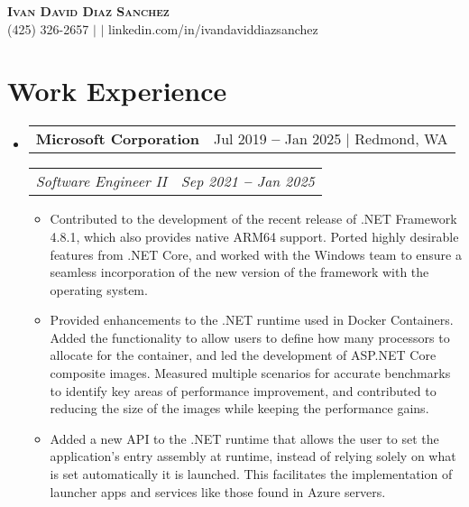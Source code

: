 \documentclass[letterpaper, 11pt]{article}
\makeatletter
\newcommand{\resumeCompanyHeading}[3]{
  \vspace{-2pt}\item
  \begin{tabular*}{0.97\textwidth}[t]{l@{\extracolsep{\fill}}r}
    \textbf{#1} & #2 $|$ #3
  \end{tabular*}
}
\newcommand{\resumePositionHeading}[2]{
  \vspace{-3pt}
  \begin{tabular*}{0.97\textwidth}[t]{l@{\extracolsep{\fill}}r}
    \textit{\small#1} & \textit{\small#2}
  \end{tabular*}\vspace{-7pt}
}
\newcommand{\resumeItem}[1]{
  \item\small{
    {#1 \vspace{-2pt}}
  }
}
\makeatother
\begin{document}
\begin{center}
  \textbf{\Huge \scshape Ivan David Diaz Sanchez} \\ \vspace{3pt}
  \small{
    \faPhone\space (425) 326-2657 $|$
    \Letter{} $|$
    \faLinkedin\space linkedin.com/in/ivandaviddiazsanchez
  }
\end{center}


\section{Work Experience}
\vspace{1pt}
\begin{itemize}[leftmargin=0.15in, label={}]


  \resumeCompanyHeading
    {Microsoft Corporation}{Jul 2019 \textbf{--} Jan 2025}{Redmond, WA}


    \resumePositionHeading
      {Software Engineer II}{Sep 2021 \textbf{--} Jan 2025}

      \begin{itemize}
        \resumeItem{Contributed to the development of the recent release of .NET Framework 4.8.1, which also provides native ARM64 support. Ported highly desirable features from .NET Core, and worked with the Windows team to ensure a seamless incorporation of the new version of the framework with the operating system.}
        \resumeItem{Provided enhancements to the .NET runtime used in Docker Containers. Added the functionality to allow users to define how many processors to allocate for the container, and led the development of ASP.NET Core composite images. Measured multiple scenarios for accurate benchmarks to identify key areas of performance improvement, and contributed to reducing the size of the images while keeping the performance gains.}
        \resumeItem{Added a new API to the .NET runtime that allows the user to set the application's entry assembly at runtime, instead of relying solely on what is set automatically it is launched. This facilitates the implementation of launcher apps and services like those found in Azure servers.}
      \end{itemize}\vspace{-5pt}


\end{itemize}
\end{document}
